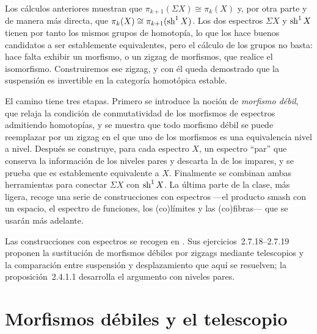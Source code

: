 Los cálculos anteriores muestran que $\pi_{k+1}(\Sigma X)\cong\pi_k(X)$ y, por otra parte y de manera más directa, que $\pi_k(X)\cong\pi_{k+1}(\operatorname{sh}^1X)$. Los dos espectros $\Sigma X$ y $\operatorname{sh}^1X$ tienen por tanto los mismos grupos de homotopía, lo que los hace buenos candidatos a ser establemente equivalentes, pero el cálculo de los grupos no basta: hace falta exhibir un morfismo, o un zigzag de morfismos, que realice el isomorfismo. Construiremos ese zigzag, y con él queda demostrado que la suspensión es invertible en la categoría homotópica estable.

El camino tiene tres etapas. Primero se introduce la noción de \emph{morfismo débil}, que relaja la condición de conmutatividad de los morfismos de espectros admitiendo homotopías, y se muestra que todo morfismo débil se puede reemplazar por un zigzag en el que uno de los morfismos es una equivalencia nivel a nivel. Después se construye, para cada espectro $X$, un espectro ``par'' que conserva la información de los niveles pares y descarta la de los impares, y se prueba que es establemente equivalente a $X$. Finalmente se combinan ambas herramientas para conectar $\Sigma X$ con $\operatorname{sh}^1X$. La última parte de la clase, más ligera, recoge una serie de construcciones con espectros ---el producto smash con un espacio, el espectro de funciones, los (co)límites y las (co)fibras--- que se usarán más adelante.

Las construcciones con espectros se recogen en \cite[\S2.3]{malkiewich}. Sus ejercicios~2.7.18--2.7.19 proponen la sustitución de morfismos débiles por zigzags mediante telescopios y la comparación entre suspensión y desplazamiento que aquí se resuelven; la proposición~2.4.1.1 desarrolla el argumento con niveles pares.


\section{Morfismos débiles y el telescopio}

